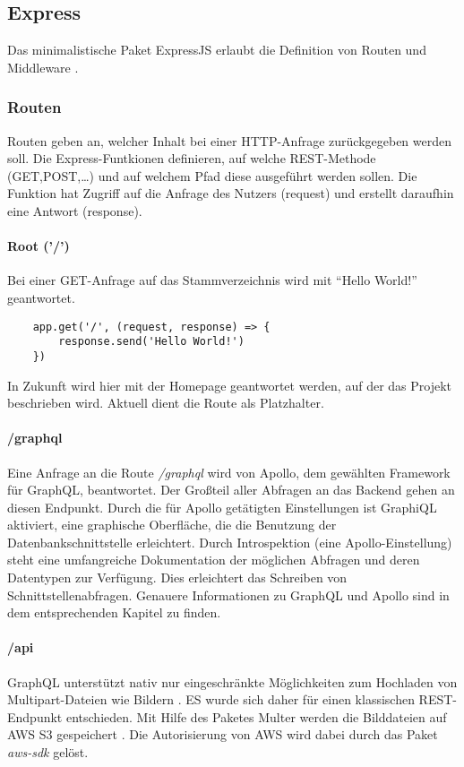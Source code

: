 \subsection{Express}
Das minimalistische
Paket ExpressJS erlaubt die Definition von Routen und Middleware \cite{be:express}\cite{be:expressRouting}\cite{be:expressMiddleware}. \\

\subsubsection{Routen}
Routen geben an, welcher Inhalt bei einer HTTP-Anfrage zurückgegeben werden soll.
Die Express-Funtkionen definieren, auf welche REST-Methode (GET,POST,\dots) und auf welchem Pfad diese ausgeführt werden sollen.
Die Funktion hat Zugriff auf die Anfrage des Nutzers (request) und erstellt daraufhin eine Antwort (response).


\paragraph{Root ('/')\\}
Bei einer GET-Anfrage auf das Stammverzeichnis wird mit \enquote{Hello World!} geantwortet.
\begin{lstlisting}
    app.get('/', (request, response) => {
        response.send('Hello World!')
    })
\end{lstlisting}
In Zukunft wird hier mit der Homepage geantwortet werden, auf der das Projekt beschrieben wird.
Aktuell dient die Route als Platzhalter.

\paragraph{/graphql\\}
Eine Anfrage an die Route \textit{/graphql} wird von Apollo, dem gewählten Framework für GraphQL, beantwortet.
Der Großteil aller Abfragen an das Backend gehen an diesen Endpunkt.
Durch die für Apollo getätigten Einstellungen ist GraphiQL aktiviert, eine graphische Oberfläche, die die Benutzung der Datenbankschnittstelle erleichtert.
Durch Introspektion (eine Apollo-Einstellung) steht eine umfangreiche Dokumentation der möglichen Abfragen und deren Datentypen zur Verfügung.
Dies erleichtert das Schreiben von Schnittstellenabfragen.
Genauere Informationen zu GraphQL und Apollo sind in dem entsprechenden Kapitel zu finden.

\paragraph{/api\\}
GraphQL unterstützt nativ nur eingeschränkte Möglichkeiten zum Hochladen von Multipart-Dateien wie Bildern \cite{be:graphQlTypes}.
ES wurde sich daher für einen klassischen REST-Endpunkt entschieden.
Mit Hilfe des Paketes Multer werden die Bilddateien auf AWS S3 gespeichert \cite{be:multer}\cite{be:multerS3}.
Die Autorisierung von AWS wird dabei durch das Paket \textit{aws-sdk} gelöst.\\


